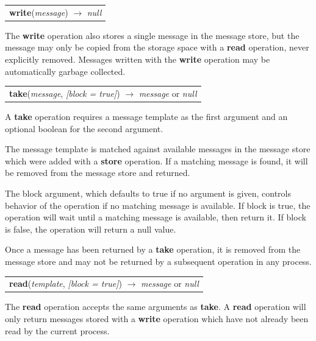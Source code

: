 \documentclass[lnicst]{svmultln}
\begin{document}
\begin{table}
\begin{tabular}{c}
\textbf{write}(\textit{message}) $\rightarrow$ \textit{null}
\end{tabular}
\end{table}

The \textbf{write} operation also stores a single message in the message store, but the message may only be copied from the storage space with a \textbf{read} operation, never explicitly removed. Messages written with the \textbf{write} operation may be automatically garbage collected.

\begin{table}
\begin{tabular}{c}
\textbf{take}(\textit{message}, \textit{[block = true]}) $\rightarrow$ \textit{message} or \textit{null}
\end{tabular}
\end{table}

A \textbf{take} operation requires a message template as the first argument and an optional boolean for the second argument.

The message template is matched against available messages in the message store which were added with a \textbf{store} operation. If a matching message is found, it will be removed from the message store and returned.

The block argument, which defaults to true if no argument is given, controls behavior of the operation if no matching message is available. If block is true, the operation will wait until a matching message is available, then return it. If block is false, the operation will return a null value.

Once a message has been returned by a \textbf{take} operation, it is removed from the message store and may not be returned by a subsequent operation in any process.

\begin{table}
\begin{tabular}{c}
\textbf{read}(\textit{template}, \textit{[block = true]}) $\rightarrow$ \textit{message} or \textit{null}
\end{tabular}
\end{table}

    The \textbf{read} operation accepts the same arguments as \textbf{take}. A \textbf{read} operation will only return messages stored with a \textbf{write} operation which have not already been read by the current process.
\end{document}
